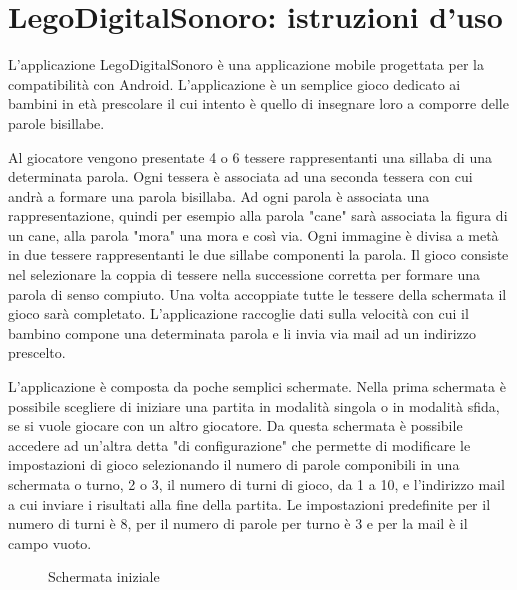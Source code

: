 \renewcommand*{\mypath}{legodigitalsonoro1}%
\graphicspath{{\mypath/images/}}


\newcommand{\includefigure}[2]{
\begin{figure}[h!]
\centering{
\texttt{[image: \#1.png]}}
\caption{#2}
\label{fig:#1}
\end{figure}
}

\section{LegoDigitalSonoro: istruzioni d'uso}

L'applicazione LegoDigitalSonoro è una applicazione mobile progettata per la compatibilità con Android. L'applicazione è un semplice gioco dedicato ai bambini in età prescolare il cui intento è quello di insegnare loro a comporre delle parole bisillabe.

Al giocatore vengono presentate 4 o 6 tessere rappresentanti una sillaba di una determinata parola. Ogni tessera è associata ad una seconda tessera con cui andrà a formare una parola bisillaba. Ad ogni parola è associata una rappresentazione, quindi per esempio alla parola "cane" sarà associata la figura di un cane, alla parola "mora" una mora e così via. Ogni immagine è divisa a metà in due tessere rappresentanti le due sillabe componenti la parola. Il gioco consiste nel selezionare la coppia di tessere nella successione corretta per formare una parola di senso compiuto. Una volta accoppiate tutte le tessere della schermata il gioco sarà completato. L'applicazione raccoglie dati sulla velocità con cui il bambino compone una determinata parola e li invia via mail ad un indirizzo prescelto.

L'applicazione è composta da poche semplici schermate. Nella prima schermata è possibile scegliere di iniziare una partita in modalità singola o in modalità sfida, se si vuole giocare con un altro giocatore. Da questa schermata è possibile accedere ad un'altra detta "di configurazione" che permette di modificare le impostazioni di gioco selezionando il numero di parole componibili in una schermata o turno, 2 o 3, il numero di turni di gioco, da 1 a 10, e l'indirizzo mail a cui inviare i risultati alla fine della partita. Le impostazioni predefinite per il numero di turni è 8, per il numero di parole per turno è 3 e per la mail è il campo vuoto.

\includefigure{main}{Schermata iniziale}


